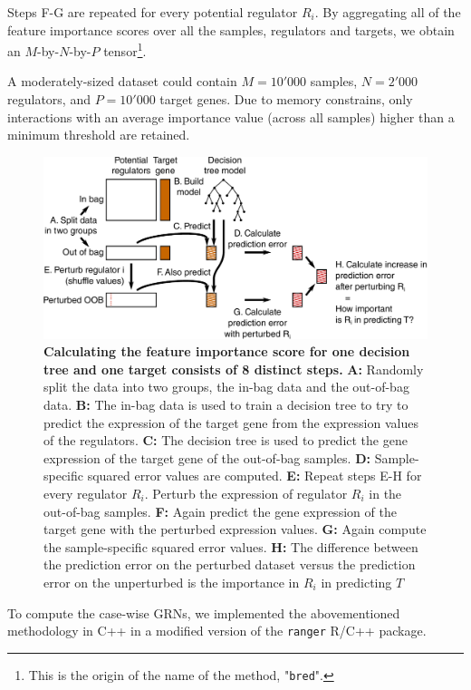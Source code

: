 Steps F-G are repeated for every potential regulator $R_i$. By aggregating all of the feature importance scores over all the samples, regulators and targets, we obtain an $M$-by-$N$-by-$P$ tensor\footnote{This is the origin of the name of the method, "\texttt{bred}".}. 

A moderately-sized dataset could contain $M=10'000$ samples, $N=2'000$ regulators, and $P=10'000$ target genes. Due to memory constrains, only interactions with an average importance value (across all samples) higher than a minimum threshold are retained.

\begin{figure}[htb!]
	\centering
	\includegraphics[width=.9\linewidth]{fig/methodology/fimp.pdf} 
	\caption{
		\textbf{Calculating the feature importance score for one decision tree and one target consists of 8 distinct steps.}
		\textbf{A:} Randomly split the data into two groups, the in-bag data and the out-of-bag data.
		\textbf{B:} The in-bag data is used to train a decision tree to try to predict the expression of the target gene from the expression values of the regulators.
		\textbf{C:} The decision tree is used to predict the gene expression of the target gene of the out-of-bag samples.
		\textbf{D:} Sample-specific squared error values are computed.
		\textbf{E:} Repeat steps E-H for every regulator $R_i$. Perturb the expression of regulator $R_i$ in the out-of-bag samples.
		\textbf{F:} Again predict the gene expression of the target gene with the perturbed expression values.
		\textbf{G:} Again compute the sample-specific squared error values.
		\textbf{H:} The difference between the prediction error on the perturbed dataset versus the prediction error on the unperturbed is the importance in $R_i$ in predicting $T$ 
	}
	\label{fig:fimp}
\end{figure}

To compute the case-wise GRNs, we implemented the abovementioned methodology in C++ in a modified version of the \texttt{ranger} R/C++ package\cite{wright_rangerfastimplementation_2017}.

